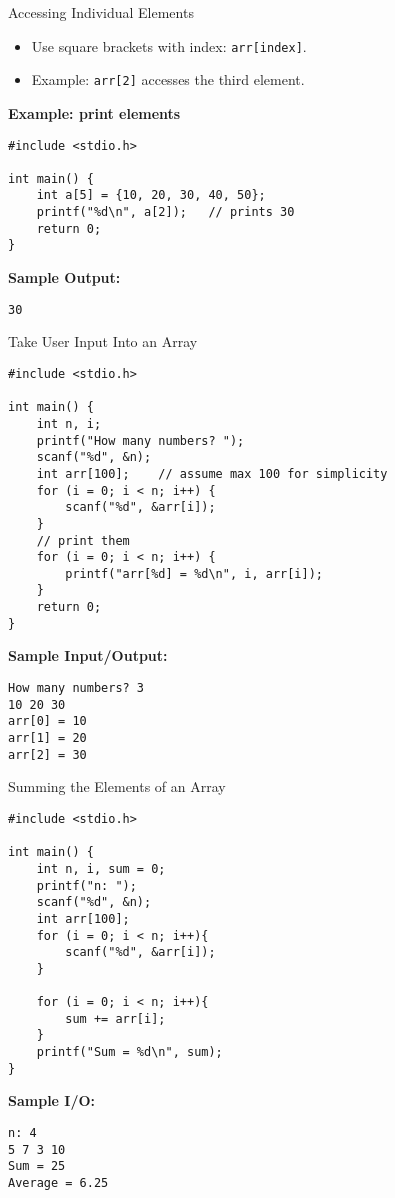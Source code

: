 \documentclass[12pt, aspectratio=169]{beamer}
\begin{document}
    \begin{frame}[fragile]{Accessing Individual Elements}
        \begin{itemize}
            \item Use square brackets with index: \texttt{arr[index]}.
            \item Example: \texttt{arr[2]} accesses the third element.
        \end{itemize}

        \textbf{Example: print elements}
        \begin{verbatim}
#include <stdio.h>

int main() {
    int a[5] = {10, 20, 30, 40, 50};
    printf("%d\n", a[2]);   // prints 30
    return 0;
}
        \end{verbatim}

        \textbf{Sample Output:}
        \begin{verbatim}
30
        \end{verbatim}
    \end{frame}

    \begin{frame}[fragile]{Take User Input Into an Array}
        \begin{verbatim}
#include <stdio.h>

int main() {
    int n, i;
    printf("How many numbers? ");
    scanf("%d", &n);
    int arr[100];    // assume max 100 for simplicity
    for (i = 0; i < n; i++) {
        scanf("%d", &arr[i]);
    }
    // print them
    for (i = 0; i < n; i++) {
        printf("arr[%d] = %d\n", i, arr[i]);
    }
    return 0;
}
        \end{verbatim}

        \textbf{Sample Input/Output:}
        \begin{verbatim}
How many numbers? 3
10 20 30
arr[0] = 10
arr[1] = 20
arr[2] = 30
        \end{verbatim}
    \end{frame}

    \begin{frame}[fragile]{Summing the Elements of an Array}
        \begin{verbatim}
#include <stdio.h>

int main() {
    int n, i, sum = 0;
    printf("n: ");
    scanf("%d", &n);
    int arr[100];
    for (i = 0; i < n; i++){
        scanf("%d", &arr[i]);
    }

    for (i = 0; i < n; i++){
        sum += arr[i];
    }
    printf("Sum = %d\n", sum);
}
        \end{verbatim}

        \textbf{Sample I/O:}
        \begin{verbatim}
n: 4
5 7 3 10
Sum = 25
Average = 6.25
        \end{verbatim}
    \end{frame}
\end{document}
